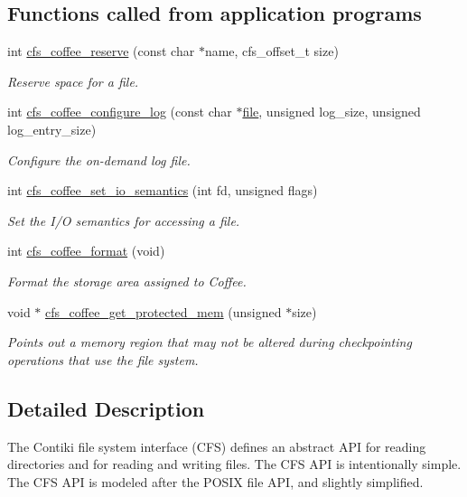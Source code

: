 \subsection*{Functions called from application programs}
\begin{DoxyCompactItemize}
\item 
int \hyperlink{group__cfs_ga2586fe834b8b6e943c5e116919edb357}{cfs\+\_\+coffee\+\_\+reserve} (const char $\ast$name, cfs\+\_\+offset\+\_\+t size)
\begin{DoxyCompactList}\small\item\em Reserve space for a file. \end{DoxyCompactList}\item 
int \hyperlink{group__cfs_ga00f5e8bad702aa74e5c14fc6f60064c8}{cfs\+\_\+coffee\+\_\+configure\+\_\+log} (const char $\ast$\hyperlink{structfile}{file}, unsigned log\+\_\+size, unsigned log\+\_\+entry\+\_\+size)
\begin{DoxyCompactList}\small\item\em Configure the on-\/demand log file. \end{DoxyCompactList}\item 
int \hyperlink{group__cfs_gacc3d4dd048dae3848693c7b175539110}{cfs\+\_\+coffee\+\_\+set\+\_\+io\+\_\+semantics} (int fd, unsigned flags)
\begin{DoxyCompactList}\small\item\em Set the I/\+O semantics for accessing a file. \end{DoxyCompactList}\item 
int \hyperlink{group__cfs_ga20f73caab6f11eebc05378fe9d4606b3}{cfs\+\_\+coffee\+\_\+format} (void)
\begin{DoxyCompactList}\small\item\em Format the storage area assigned to Coffee. \end{DoxyCompactList}\item 
void $\ast$ \hyperlink{group__cfs_gae4e97787746c7040c54f5adf60d4709b}{cfs\+\_\+coffee\+\_\+get\+\_\+protected\+\_\+mem} (unsigned $\ast$size)
\begin{DoxyCompactList}\small\item\em Points out a memory region that may not be altered during checkpointing operations that use the file system. \end{DoxyCompactList}\end{DoxyCompactItemize}


\subsection{Detailed Description}
The Contiki file system interface (C\+F\+S) defines an abstract A\+P\+I for reading directories and for reading and writing files. The C\+F\+S A\+P\+I is intentionally simple. The C\+F\+S A\+P\+I is modeled after the P\+O\+S\+I\+X file A\+P\+I, and slightly simplified. 

